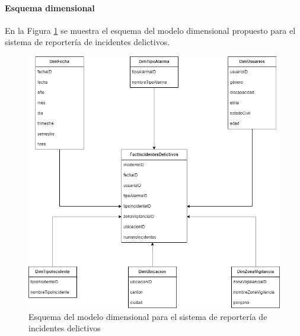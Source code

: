 

\paragraph{Esquema dimensional}

En la Figura \ref{fig:esquema-modelo-dimensional} se muestra el esquema del modelo dimensional propuesto para el sistema de reportería de incidentes delictivos.

\begin{figure}[H]
    \centering
    \includegraphics[width=1\textwidth]{chapters/III-resultados-y-discusion/resources/images/esquema-modelo-dimensional.png}
    \caption{Esquema del modelo dimensional para el sistema de reportería de incidentes delictivos}
    \label{fig:esquema-modelo-dimensional}
\end{figure}